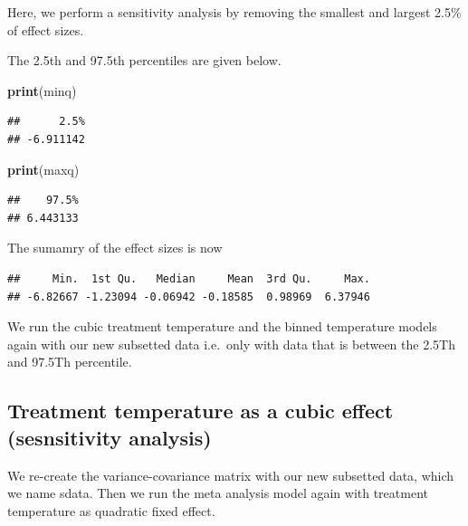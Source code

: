 \documentclass[
]{article}
\newenvironment{Shaded}{\begin{snugshade}}{\end{snugshade}}
\newcommand{\FunctionTok}[1]{\textcolor[rgb]{0.13,0.29,0.53}{\textbf{#1}}}
\newcommand{\NormalTok}[1]{#1}
\newcommand{\SpecialCharTok}[1]{\textcolor[rgb]{0.81,0.36,0.00}{\textbf{#1}}}
\begin{document}
Here, we perform a sensitivity analysis by removing the smallest and
largest 2.5\% of effect sizes.

The 2.5th and 97.5th percentiles are given below.

\begin{Shaded}
\begin{Highlighting}[]
\FunctionTok{print}\NormalTok{(minq)}
\end{Highlighting}
\end{Shaded}

\begin{verbatim}
##      2.5% 
## -6.911142
\end{verbatim}

\begin{Shaded}
\begin{Highlighting}[]
\FunctionTok{print}\NormalTok{(maxq)}
\end{Highlighting}
\end{Shaded}

\begin{verbatim}
##    97.5% 
## 6.443133
\end{verbatim}

The sumamry of the effect sizes is now

\begin{Shaded}
\end{Shaded}

\begin{verbatim}
##     Min.  1st Qu.   Median     Mean  3rd Qu.     Max. 
## -6.82667 -1.23094 -0.06942 -0.18585  0.98969  6.37946
\end{verbatim}

We run the cubic treatment temperature and the binned temperature models
again with our new subsetted data i.e.~only with data that is between
the 2.5Th and 97.5Th percentile.

\hypertarget{treatment-temperature-as-a-cubic-effect-sesnsitivity-analysis}{%
\subsection{Treatment temperature as a cubic effect (sesnsitivity
analysis)}\label{treatment-temperature-as-a-cubic-effect-sesnsitivity-analysis}}

We re-create the variance-covariance matrix with our new subsetted data,
which we name sdata. Then we run the meta analysis model again with
treatment temperature as quadratic fixed effect.
\end{document}
